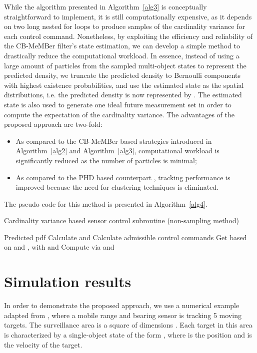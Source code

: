 \documentclass[twocolumn]{autart}
\begin{document}
While the algorithm presented in Algorithm~\ref{alg3} is conceptually straightforward to implement, it is still computationally expensive, as it depends on two long nested for loops to produce samples of the cardinality variance for each control command. Nonetheless, by exploiting the
efficiency and reliability of the CB-MeMBer filter's state estimation, we can develop a
simple method to drastically reduce the computational workload.
In essence, instead of using a large amount of particles from the sampled multi-object states  to represent the predicted density, we truncate the predicted density to  Bernoulli components with highest existence probabilities, and
use the estimated state  as the spatial
distributions, i.e. the predicted density is now represented by . The estimated state  is also used to generate one ideal future measurement set in order to compute the expectation of the cardinality variance. The advantages of the proposed approach are two-fold:
\begin{itemize}
\item As compared to the CB-MeMBer based strategies introduced in Algorithm~\ref{alg2} and Algorithm~\ref{alg3}, computational workload is significantly reduced as the number of particles is minimal;
\item As compared to the PHD based counterpart \cite{RVC11}, tracking performance is improved because the need for clustering techniques is eliminated.
\end{itemize}
The pseudo code for this method is presented in Algorithm~\ref{alg4}.
\begin{algorithm}[htb]
\caption{Cardinality variance based sensor control subroutine (non-sampling method)}
\label{alg4}
\begin{algorithmic}[1]
    \Require Predicted pdf 
    \Ensure 
    \State Calculate  and 
    \State Calculate admissible control commands 
    \For{}
    \State Get  based on  and , with 
    \Statex \quad\; and 
    \State Compute   via  and 
    \Statex \quad\; 
    \EndFor
    \State 
\end{algorithmic}
\end{algorithm}



\section{Simulation results}

In order to demonstrate the proposed approach, we use a numerical example
adapted from \cite{RVC11}, where a mobile range and bearing sensor is
tracking 5 moving targets. The surveillance area is a square of dimensions . Each target in this area is characterized by a
single-object state of the form , where  is the position and  is the velocity of the target.
\end{document}
